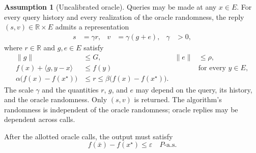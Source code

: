 \documentclass[10pt]{article}
\theoremstyle{definition}
\newtheorem{assumption}{Assumption}
\begin{document}
\begin{assumption}[Uncalibrated oracle]
Queries may be made at any $x\in E$. For every query history and every realization of the oracle randomness, the reply $(s,v)\in\mathbb{R}\times E$ admits a representation
\[
\begin{aligned}
s&=\gamma r, & v&=\gamma(g+e), & \gamma&>0,
\end{aligned}
\]
where $r\in\mathbb{R}$ and $g,e\in E$ satisfy
\[
\begin{aligned}
\|g\|&\leq G, & \|e\|&\leq\rho,\\
f(x)+\langle g,y-x\rangle&\leq f(y)
&&\text{for every }y\in E,\\
\alpha\bigl(f(x)-f(x^\star)\bigr)&\leq r
\leq\beta\bigl(f(x)-f(x^\star)\bigr).
\end{aligned}
\]
The scale $\gamma$ and the quantities $r$, $g$, and $e$ may depend on the query, its history, and the oracle randomness. Only $(s,v)$ is returned. The algorithm's randomness is independent of the oracle randomness; oracle replies may be dependent across calls.
\end{assumption}

After the allotted oracle calls, the output must satisfy
\[
f(\bar{x})-f(x^\star)\leq\varepsilon
\quad P\text{-a.s.}
\]
\end{document}
